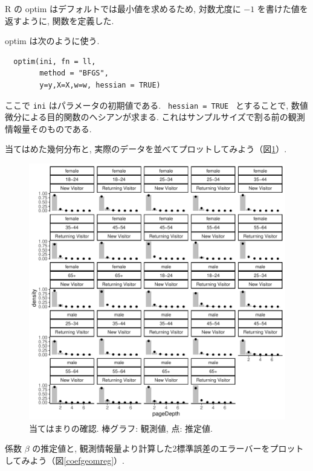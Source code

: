 \documentclass[a4paper, 12pt]{jarticle}
\begin{document}
R の optim はデフォルトでは最小値を求めるため, 対数尤度に $-1$ を書けた値を返すように, 関数を定義した. 

optim は次のように使う.
\begin{verbatim}
  optim(ini, fn = ll,
        method = "BFGS",
        y=y,X=X,w=w, hessian = TRUE)
\end{verbatim}
ここで \verb|ini| はパラメータの初期値である. \verb| hessian = TRUE | とすることで, 数値微分による目的関数のヘシアンが求まる. これはサンプルサイズで割る前の観測情報量そのものである. 

当てはめた幾何分布と, 実際のデータを並べてプロットしてみよう（図\ref{fitgeomreg}）.

\begin{figure}
\includegraphics[width=13cm,clip]{./img/fitgeomreg.pdf}
\caption{当てはまりの確認. 棒グラフ: 観測値, 点: 推定値.}
\label{fitgeomreg}
\end{figure}

係数 $\beta$ の推定値と, 観測情報量より計算した2標準誤差のエラーバーをプロットしてみよう（図\ref{coefgeomreg}）. 
\end{document}
